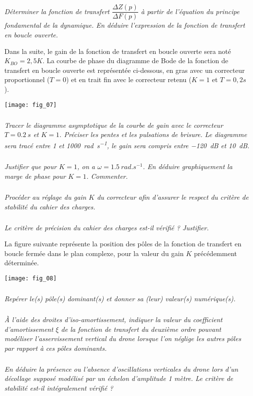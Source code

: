\begin{multicols}{2}
\subparagraph{}\textit{Déterminer la fonction de transfert $\dfrac{\Delta Z(p)}{\Delta F(p)}$ à partir de l'équation du principe fondamental de la dynamique. En déduire l'expression de la fonction de transfert en boucle ouverte. }


Dans la suite, le gain de la fonction de transfert en boucle ouverte sera noté $K_{BO}=2,5 K$.
La courbe de phase du diagramme de Bode de la fonction de transfert en boucle ouverte est représentée ci-dessous, en gras avec un correcteur proportionnel ($T=0$) et en trait fin avec le correcteur retenu ($K=1$ et $T=0,2s$).


\begin{center}
\texttt{[image: fig\_07]}
\end{center}


\subparagraph{}\textit{Tracer le diagramme asymptotique de la courbe de gain avec le correcteur $T=\SI{0,2}{s}$ et $K=1$.
Préciser les pentes et les pulsations de brisure. Le diagramme sera tracé entre 1 et \SI{1000}{rad.s^{-1}}, le gain sera compris entre \SI{-120}{dB} et \SI{+10}{dB}.}

\subparagraph{}\textit{Justifier que pour $K=1$, on a $\omega=\SI{1,5}{rad.s^{-1}}$. En déduire graphiquement la marge de phase pour
$K=1$. Commenter.}

\subparagraph{}\textit{Procéder au réglage du gain $K$ du correcteur afin d’assurer le respect du critère de stabilité du cahier des charges.}

\subparagraph{}\textit{Le critère de précision du cahier des charges est-il vérifié ? Justifier.}

La figure suivante représente la position des pôles de la fonction de transfert en boucle fermée dans le plan
complexe, pour la valeur du gain $K$ précédemment déterminée.


\begin{center}
\texttt{[image: fig\_08]}
\end{center}


\subparagraph{}\textit{Repérer le(s) pôle(s) dominant(s) et donner sa (leur) valeur(s) numérique(s).}

\subparagraph{}\textit{À l’aide des droites d’iso-amortissement, indiquer la valeur du coefficient d’amortissement $\xi$ de la
fonction de transfert du deuxième ordre pouvant modéliser l’asservissement vertical du drone lorsque
l’on néglige les autres pôles par rapport à ces pôles dominants.}

\subparagraph{}\textit{En déduire la présence ou l’absence d’oscillations verticales du drone lors d’un décollage supposé
modélisé par un échelon d’amplitude 1 mètre. Le critère de stabilité est-il intégralement vérifié ?}


\end{multicols}
